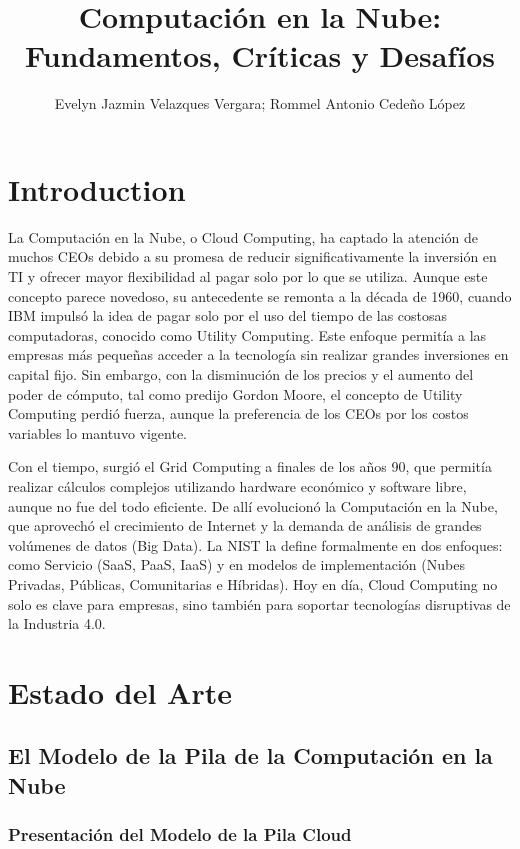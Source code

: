 \documentclass{article}
\title{Computación en la Nube: Fundamentos,
Críticas y Desafíos}
\author{Evelyn Jazmin Velazques Vergara; Rommel Antonio Cedeño López}
\begin{document}
\maketitle

\section{Introduction}

La Computación en la Nube, o Cloud Computing, ha captado la atención de muchos CEOs debido a su promesa de reducir significativamente la inversión en TI y ofrecer mayor flexibilidad al pagar solo por lo que se utiliza. Aunque este concepto parece novedoso, su antecedente se remonta a la década de 1960, cuando IBM impulsó la idea de pagar solo por el uso del tiempo de las costosas computadoras, conocido como Utility Computing. Este enfoque permitía a las empresas más pequeñas acceder a la tecnología sin realizar grandes inversiones en capital fijo. Sin embargo, con la disminución de los precios y el aumento del poder de cómputo, tal como predijo Gordon Moore, el concepto de Utility Computing perdió fuerza, aunque la preferencia de los CEOs por los costos variables lo mantuvo vigente.

Con el tiempo, surgió el Grid Computing a finales de los años 90, que permitía realizar cálculos complejos utilizando hardware económico y software libre, aunque no fue del todo eficiente. De allí evolucionó la Computación en la Nube, que aprovechó el crecimiento de Internet y la demanda de análisis de grandes volúmenes de datos (Big Data). La NIST la define formalmente en dos enfoques: como Servicio (SaaS, PaaS, IaaS) y en modelos de implementación (Nubes Privadas, Públicas, Comunitarias e Híbridas). Hoy en día, Cloud Computing no solo es clave para empresas, sino también para soportar tecnologías disruptivas de la Industria 4.0.

\section{Estado del Arte}

\subsection{El Modelo de la Pila de la Computación en la Nube}
\subsubsection{Presentación del Modelo de la Pila Cloud}
\end{document}
